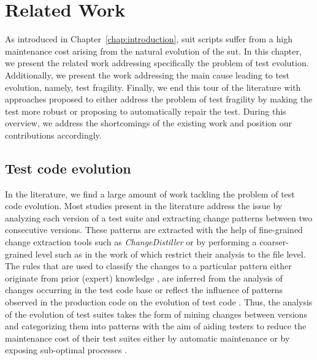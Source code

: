 \chapter{Related Work}
\label{chap:related-work}


As introduced in Chapter~\ref{chap:introduction}, \gls{suit} scripts suffer from a high maintenance cost arising from the natural evolution of the \gls{sut}. In this chapter, we present the related work addressing specifically the problem of test evolution. Additionally, we present the work addressing the main cause leading to test evolution, namely, test fragility. Finally, we end this tour of the literature with approaches proposed to either address the problem of test fragility by making the test more robust or proposing to automatically repair the test. During this overview, we address the shortcomings of the existing work and position our contributions accordingly.

\section{Test code evolution}
\label{sec:related-evolution}

In the literature, we find a large amount of work tackling the problem of test code evolution. Most studies present in the literature address the issue by analyzing each version of a test suite and extracting change patterns between two consecutive versions. These patterns are extracted with the help of fine-grained change extraction tools such as \emph{ChangeDistiller} \cite{Fluri2007} or by performing a coarser-grained level such as in the work of \textcite{Zaidman2011} which restrict their analysis to the file level. The rules that are used to classify the changes to a particular pattern either originate from prior (expert) knowledge \cite{Marsavina2014}, are inferred from the analysis of changes occurring in the test code base \cite{Negara2014, Labuschagne2017} or reflect the influence of patterns observed in the production code on the evolution of test code \cite{VanRompaey2008}. Thus, the analysis of the evolution of test suites takes the form of mining changes between versions and categorizing them into patterns with the aim of aiding testers to reduce the maintenance cost of their test suites either by automatic maintenance \cite{Hurdugaci2012} or by exposing sub-optimal processes \cite{Labuschagne2017}.

